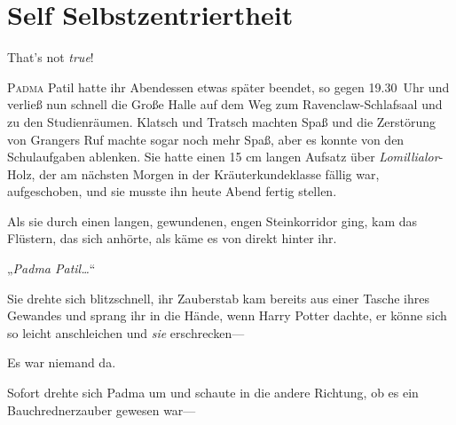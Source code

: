 \chapter{Self Selbstzentriertheit}

That’s not \emph{true}!

\lettrine{P}{adma} Patil hatte ihr Abendessen etwas später beendet, so gegen 19.30~Uhr und verließ nun schnell die Große Halle auf dem Weg zum Ravenclaw-Schlafsaal und zu den Studienräumen. Klatsch und Tratsch machten Spaß und die Zerstörung von Grangers Ruf machte sogar noch mehr Spaß, aber es konnte von den Schulaufgaben ablenken. Sie hatte einen 15 cm langen Aufsatz über \emph{Lomillialor}-Holz, der am nächsten Morgen in der Kräuterkundeklasse fällig war, aufgeschoben, und sie musste ihn heute Abend fertig stellen.

Als sie durch einen langen, gewundenen, engen Steinkorridor ging, kam das Flüstern, das sich anhörte, als käme es von direkt hinter ihr.

„\emph{Padma Patil…}“

Sie drehte sich blitzschnell, ihr Zauberstab kam bereits aus einer Tasche ihres Gewandes und sprang ihr in die Hände, wenn Harry Potter dachte, er könne sich so leicht anschleichen und \emph{sie} erschrecken—

Es war niemand da.

Sofort drehte sich Padma um und schaute in die andere Richtung, ob es ein Bauchrednerzauber gewesen war—

